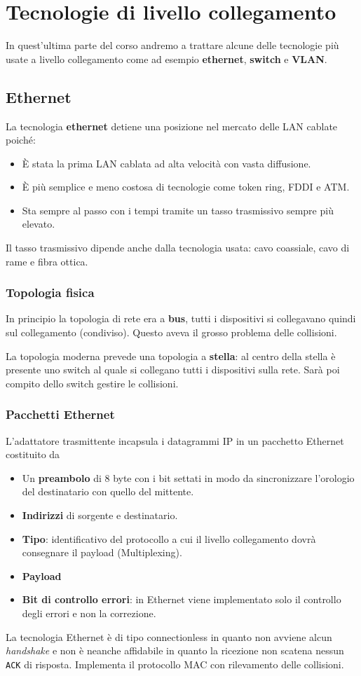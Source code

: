 \section{Tecnologie di livello collegamento}
In quest'ultima parte del corso andremo a trattare alcune delle
tecnologie più usate a livello collegamento come ad esempio
\textbf{ethernet}, \textbf{switch} e \textbf{VLAN}.

\subsection{Ethernet}
La tecnologia \textbf{ethernet} detiene una posizione nel mercato delle
LAN cablate poiché:
\begin{itemize}
	\item \`E stata la prima LAN cablata ad alta velocità con vasta
		diffusione.
	\item \`E più semplice e meno costosa di tecnologie come token
		ring, FDDI e ATM.
	\item Sta sempre al passo con i tempi tramite un tasso trasmissivo
		sempre più elevato.
\end{itemize}
Il tasso trasmissivo dipende anche dalla tecnologia usata: cavo 
coassiale, cavo di rame e fibra ottica.

\subsubsection{Topologia fisica}
In principio la topologia di rete era a \textbf{bus}, tutti i 
dispositivi si collegavano quindi sul collegamento (condiviso). Questo
aveva il grosso problema delle collisioni.

La topologia moderna prevede una topologia a \textbf{stella}: al centro
della stella è presente uno switch al quale si collegano tutti i 
dispositivi sulla rete. Sarà poi compito dello switch gestire le
collisioni.

\subsubsection{Pacchetti Ethernet}
L'adattatore trasmittente incapsula i datagrammi IP in un pacchetto
Ethernet costituito da
\begin{itemize}
	\item Un \textbf{preambolo} di 8 byte con i bit settati in modo da
		sincronizzare l'orologio del destinatario con quello del
		mittente.
	\item \textbf{Indirizzi} di sorgente e destinatario.
	\item \textbf{Tipo}: identificativo del protocollo a cui il livello
		collegamento dovrà consegnare il payload (Multiplexing).
	\item \textbf{Payload}
	\item \textbf{Bit di controllo errori}: in Ethernet viene
		implementato solo il controllo degli errori e non la
		correzione.
\end{itemize}
La tecnologia Ethernet è di tipo connectionless in quanto non avviene
alcun \emph{handshake} e non è neanche affidabile in quanto la 
ricezione non scatena nessun \verb|ACK| di risposta. Implementa il 
protocollo MAC con rilevamento delle collisioni.

